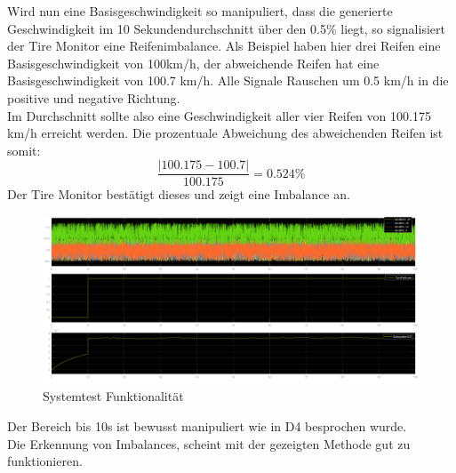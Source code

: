 Wird nun eine Basisgeschwindigkeit so manipuliert, dass die generierte Geschwindigkeit im 10 Sekundendurchschnitt über den 0.5\% liegt, so signalisiert der Tire Monitor eine Reifenimbalance. Als Beispiel haben hier drei Reifen eine Basisgeschwindigkeit von 100km/h, der abweichende Reifen hat eine Basisgeschwindigkeit von 100.7 km/h. Alle Signale Rauschen um 0.5 km/h in die positive und negative Richtung.\\
Im Durchschnitt sollte also eine Geschwindigkeit aller vier Reifen von 100.175 km/h erreicht werden. Die prozentuale Abweichung des abweichenden Reifen ist somit:
$$
\dfrac{|100.175-100.7|}{100.175} = 0.524\%
$$
Der Tire Monitor bestätigt dieses und zeigt eine Imbalance an.
\begin{figure}[H]
	\centering
	\includegraphics[width=0.95\linewidth]{../Graphiken/RandomAbweichung}
	\caption{Systemtest Funktionalität}
	\label{fig:funkt}
\end{figure}
Der Bereich bis 10s ist bewusst manipuliert wie in D4 besprochen wurde.\\

Die Erkennung von Imbalances, scheint mit der gezeigten Methode gut zu funktionieren.

